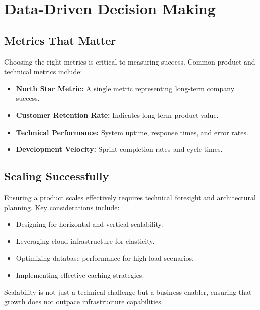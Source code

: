 \section{Data-Driven Decision Making}

\subsection{Metrics That Matter}
Choosing the right metrics is critical to measuring success. Common product and technical metrics include:

\begin{itemize}
    \item \textbf{North Star Metric:} A single metric representing long-term company success.
    \item \textbf{Customer Retention Rate:} Indicates long-term product value.
    \item \textbf{Technical Performance:} System uptime, response times, and error rates.
    \item \textbf{Development Velocity:} Sprint completion rates and cycle times.
\end{itemize}



\subsection{Scaling Successfully}
Ensuring a product scales effectively requires technical foresight and architectural planning. Key considerations include:

\begin{itemize}
    \item Designing for horizontal and vertical scalability.
    \item Leveraging cloud infrastructure for elasticity.
    \item Optimizing database performance for high-load scenarios.
    \item Implementing effective caching strategies.
\end{itemize}

Scalability is not just a technical challenge but a business enabler, ensuring that growth does not outpace infrastructure capabilities.
